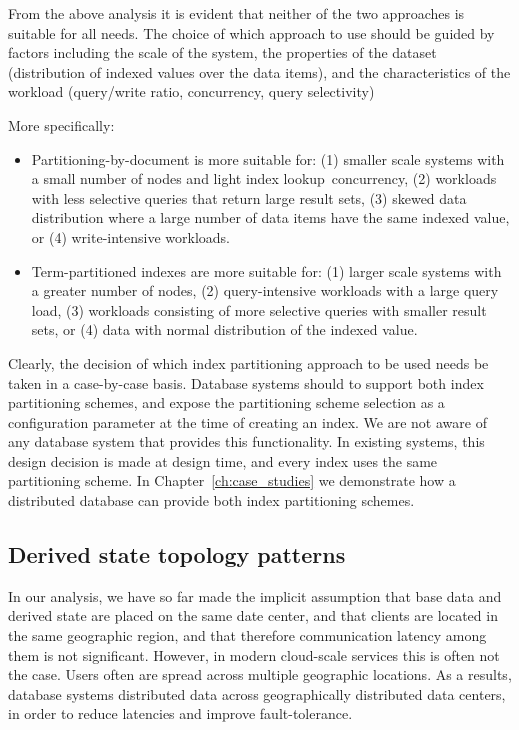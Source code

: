 From the above analysis it is evident that neither of the two approaches is suitable for all needs.
The choice of which approach to use should be guided by factors including the scale of the system,
the properties of the dataset (distribution of indexed values over the data items),
and the characteristics of the workload (query/write ratio, concurrency, query selectivity)

More specifically:
\begin{itemize}

  \item Partitioning-by-document is more suitable for:
  (1) smaller scale systems with a small number of nodes and light index lookup concurrency,
  (2) workloads with less selective queries that return large result sets,
  (3) skewed data distribution where a large number of data items have the same indexed value,
  or (4) write-intensive workloads.

  \item Term-partitioned indexes are more suitable for:
  (1) larger scale systems with a greater number of nodes,
  (2) query-intensive workloads with a large query load,
  (3) workloads consisting of more selective queries with smaller result sets,
  or (4) data with normal distribution of the indexed value.

\end{itemize}

Clearly, the decision of which index partitioning approach to be used needs be taken in a case-by-case basis.
Database systems should to support both index partitioning schemes, and expose the partitioning scheme selection as a
configuration parameter at the time of creating an index.
We are not aware of any database system that provides this functionality.
In existing systems, this design decision is made at design time, and every index uses the same partitioning scheme.
\cite{kejriwal:slik, tan:diffindex, riakv:secondaryindexes, cassandra:secondaryindexing}
In Chapter~\ref{ch:case_studies} we demonstrate how a distributed database can provide both index partitioning
schemes.


\subsection{Derived state topology patterns}
\label{sec:topology_patterns}

In our analysis, we have so far made the implicit assumption that base data and derived state are placed on the
same date center, and that clients are located in the same geographic region,
and that therefore communication latency among them is not significant.
However, in modern cloud-scale services this is often not the case.
Users often are spread across multiple geographic locations.
As a results, database systems distributed data across geographically distributed data centers,
in order to reduce latencies and improve fault-tolerance.

